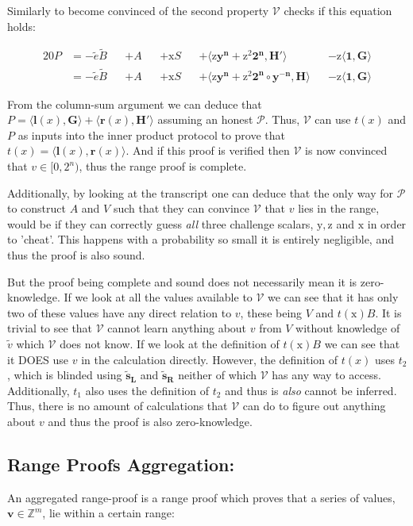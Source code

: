 \documentclass{article}
\newcommand{\eq}[1]{\begin{alignat*}{20}#1\end{alignat*}}
\renewcommand{\vec}[1]{\boldsymbol{#1}}
\newcommand{\ran}[1]{\mathrm{#1}}
\newcommand{\vecran}[1]{\mathbf{#1}}
\newcommand{\V}{\mathcal{V}}
\renewcommand{\P}{\mathcal{P}}
\newcommand{\Z}{\mathbb{Z}}
\newcommand{\dotp}[2]{\langle #1, #2 \rangle}
\newcommand{\opn}[1]{\operatorname{#1}}
\newcommand{\vecl}[1]{\vec{#1_{\opn{L}}}}
\newcommand{\vecr}[1]{\vec{#1_{\opn{R}}}}
\newcommand{\blind}[1]{\widetilde{#1}}
\newcommand{\bv}{\blind{v}}
\newcommand{\bB}{\blind{B}}
\newcommand{\be}{\blind{e}}
\newcommand{\bs}{\blind{s}}
\begin{document}
Similarly to become convinced of the second property $\V$ checks if
this equation holds:

\eq{
	P &= -\be\bB &&+ A &&+ \ran{x}S &&+ \dotp{\ran{z}\vecran{y}^{\vecran{n}} + \ran{z^2}\vec{2^n}}{\vec{H'}} &&- \ran{z}\dotp{\vec{1}}{\vec{\vec{G}}} \\
	&= -\be\bB &&+ A &&+ \ran{x}S &&+ \dotp{\ran{z}\vecran{y}^{\vecran{n}} + \ran{z^2}\vec{2^n}\circ\vecran{y^{-n}}}{\vec{H}} &&- \ran{z}\dotp{\vec{1}}{\vec{G}}
}

From the column-sum argument we can deduce that $P =
\dotp{\vec{l}(x)}{\vec{G}} + \dotp{\vec{r}(x)}{\vec{H'}}$
assuming an honest $\P$. Thus, $\V$ can use $t(x)$ and $P$ as
inputs into the inner product protocol to prove that $ t(x) =
\dotp{\vec{l}(x)}{\vec{r}(x)}$. And if this proof is verified then
$\V$ is now convinced that $v\in [0,2^n)$, thus the range proof is 
complete.

Additionally, by looking at the transcript one can deduce that the
only way for $\P$ to construct $A$ and $V$ such that they can convince
$\V$ that $v$ lies in the range, would be if they can correctly guess
\textit{all} three challenge scalars, $\ran{y}, \ran{z}$ and $\ran{x}$
in order to 'cheat'. This happens with a probability so small it is
entirely negligible, and thus the proof is also sound.

But the proof being complete and sound does not necessarily mean it is
zero-knowledge. If we look at all the values available to $\V$ we can 
see that it has only two of these values have any direct relation to 
$v$, these being $V$ and $t(\ran{x})B$. It is trivial to see that $\V$ 
cannot learn anything about $v$ from $V$ without knowledge of $\bv$ 
which $\V$ does not know. If we look at the definition of $t(\ran{x})B$ 
we can see that it DOES use $v$ in the calculation directly. However,
the definition of $t(x)$ uses $t_2$, which is blinded using
$\vecl{\bs}$ and $\vecr{\bs}$ neither of which $\V$ has any way
to access. Additionally, $t_1$ also uses the definition of $t_2$ and
thus is \textit{also} cannot be inferred. Thus, there is no amount
of calculations that $\V$ can do to figure out anything about $v$
and thus the proof is also zero-knowledge.

\subsection{Range Proofs Aggregation:} \label{range-proof-aggregation}

An aggregated range-proof is a range proof which proves that a series
of values, $\vec{v} \in \Z^m$, lie within a certain range:
\end{document}
